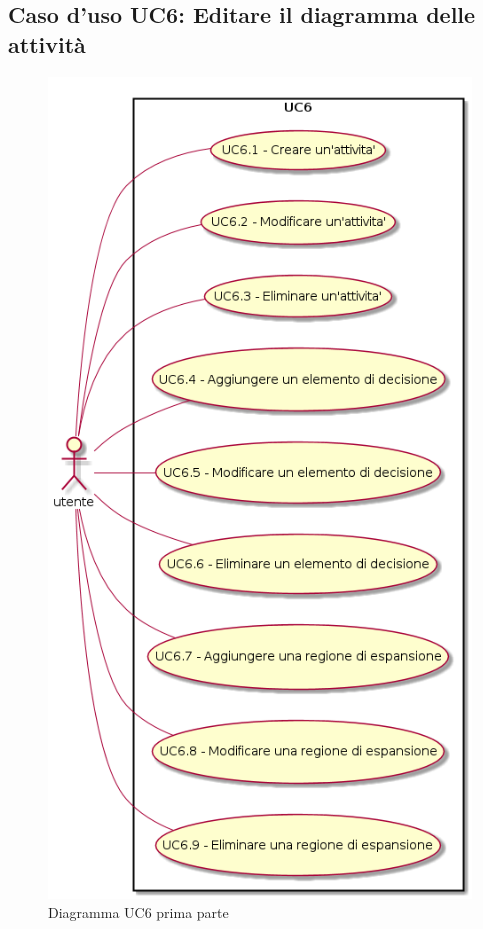 \documentclass[../AnalisiDeiRequisiti.tex]{subfiles}
\begin{document}
			\subsection{Caso d'uso UC6: Editare il diagramma delle attività}
			\begin{figure} [H]
				\centering
				\includegraphics[scale=0.45]{./Figures/UC6parte1.png}
				\caption{Diagramma UC6 prima parte}\label{}
			\end{figure}
\end{document}
